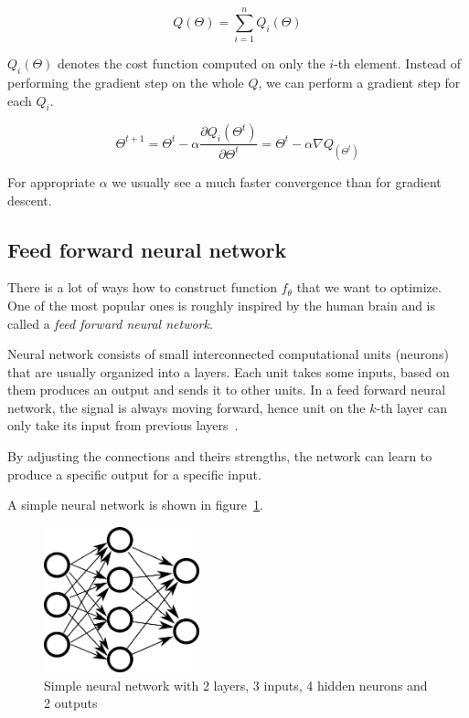     $$Q(\Theta) = \sum_{i=1}^n Q_i(\Theta)$$
    
    $Q_i(\Theta)$ denotes the cost function computed on only the $i$-th element. 
    Instead of performing the gradient step on the whole $Q$, 
    we can perform a gradient step for each $Q_i$. 

    \begin{equation}
    \Theta^{t+1} = \Theta^t - \alpha \frac{\partial Q_i(\Theta^t)}{\partial \Theta^t} = \Theta^t - \alpha \nabla Q_(\Theta^t)
    \label{eq:stochastic:gradient:descent}
    \end{equation}
    
    For appropriate $\alpha$ we usually see a much faster convergence than for gradient descent.
    
    \subsection{Feed forward neural network}
    There is a lot of ways how to construct function $f_\theta$ that we want to optimize. 
    One of the most popular ones is roughly inspired by the human brain and is called a \textit{feed forward neural network}. \* %
    
    Neural network consists of small interconnected computational units (neurons) that are usually organized into a layers.
    Each unit takes some inputs, based on them produces an output and sends it to other units. 
    In a feed forward neural network, the signal is always moving forward,
    hence unit on the $k$-th layer can only take its input from previous layers~\cite{Goodfellow-et-al-2016}.
    
    By adjusting the connections and theirs strengths, the network can learn to produce a specific output for a specific input.
    
    A simple neural network is shown in figure~\ref{obr:siet}.
    
    \begin{figure}[h]
    \centerline{\includegraphics[width=0.4\textwidth]{images/neural_network}}
    \caption[Simple neural network with 2 layers, 3 inputs, 4 neurons and 2 outputs]{Simple neural network with 2 layers, 3 inputs, 4 hidden neurons and 2 outputs}
    \label{obr:siet}
    \end{figure}
    
